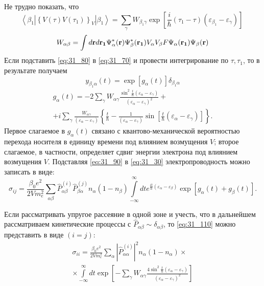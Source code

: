 \noindent Не трудно показать, что
\begin{equation} \label{eq:31_80}
\left\langle {\beta }_1\left|{\left\{V\left(\tau \right)V\left({\tau }_1\right)\right\}}_V\right|{\beta }_1\right\rangle =\sum_{\gamma }{W_{{\beta }_1\gamma }\exp \left[\frac{i}{\hbar }\left({\tau }_1-\tau \right)\left({\varepsilon }_{{\beta }_1}-{\varepsilon }_{\gamma }\right)\right]\ }
\end{equation}
\begin{equation} \label{eq:31_85}
W_{\alpha\beta}=\int{d\boldsymbol{\mathbf{r}} d\boldsymbol{\mathbf{r_1}} \Psi^*_\alpha(\boldsymbol{\mathbf{r}}) \Psi^*_\beta(\boldsymbol{\mathbf{r_1}}) V_\alpha V_\beta F \Psi_\alpha(\boldsymbol{\mathbf{r_1}}) \Psi_\beta(\boldsymbol{\mathbf{r}})}
\end{equation}
Если подставить \eqref{eq:31_80} в \eqref{eq:31_70} и провести интегрирование по $\tau ,{\tau }_1$, то в результате получаем
\begin{equation} \label{eq:31_90}
y_{{\beta }_1\alpha}(t)=\exp [g_{\alpha }\left(t\right)]{\delta }_{{\beta }_1\alpha}
\end{equation}
\begin{multline} \label{eq:31_100}
g_{\alpha}(t)=-2\sum_{\gamma}{W_{\alpha \gamma }\frac{{\sin}^2 \frac{t}{\hbar } (\varepsilon_{\alpha} - \varepsilon_{\gamma})}{{(\varepsilon_{\alpha} - \varepsilon_{\gamma})}^2}}+\\
+i\sum_{\gamma }{\frac{W_{\alpha \gamma}}{(\varepsilon_{\alpha} - \varepsilon_{\gamma})}}\left\{\frac{t}{\hbar }-\frac{1}{(\varepsilon_{\alpha} - \varepsilon_{\gamma})}{\sin\left[ \frac{t}{\hbar }(\varepsilon_{\alpha } - \varepsilon_{\gamma})\right] }\right\}.	
\end{multline}
Первое слагаемое в $g_{\alpha }\left(t\right)$ связано с квантово-механической вероятностью перехода носителя в единицу времени под влиянием возмущения $V$; второе слагаемое, в частности, определяет сдвиг энергии электрона под влиянием возмущения $V$.
Подставляя \eqref{eq:31_90} в \eqref{eq:31_30} электропроводность можно записать в виде:
\begin{equation} \label{eq:31_110}
{\sigma }_{ij}=\frac{{\beta }_0e^2}{2Vm^2_e}\sum_{\alpha \beta }{{\hat{P}}^{\left(i\right)}_{\alpha \beta }{\hat{P}}^{\left(j\right)}_{\beta \alpha }n_{\alpha }\left(1-n_{\beta }\right)}\int\limits_{-\infty }^\infty{dt e^{\frac{it}{\hbar }({\varepsilon }_{\alpha }-{\varepsilon }_{\beta })}\exp [g_{\alpha }(t)+g_{\beta }(t)]}.
\end{equation} 

Если рассматривать упругое рассеяние в одной зоне и учесть, что в дальнейшем рассматриваем кинетические процессы с ${\hat{P}}_{\alpha \beta }\sim {\delta }_{\alpha \beta }$, то \eqref{eq:31_110} можно представить в виде $(i=j)$:
\begin{multline} \label{eq:31_120}
{\sigma }_{ii}=\frac{{\beta }_0e^2}{2Vm^2_e}\sum_{\alpha }{{\left|{\hat{P}}^{(i)}_{\alpha \alpha }\right|}^2 n_{\alpha }\left(1-n_{\alpha }\right)}\times\\
\times\int\limits_{- \infty }^\infty {dt \exp \left[-\sum_{\gamma }{W_{\alpha \gamma }\frac{4 \sin^2 \frac{t}{\hbar}\left({\varepsilon }_{\alpha }-{\varepsilon }_{\gamma }\right)}{(\varepsilon_{\alpha } - \varepsilon_{\gamma })^2}}\right]}
\end{multline}

